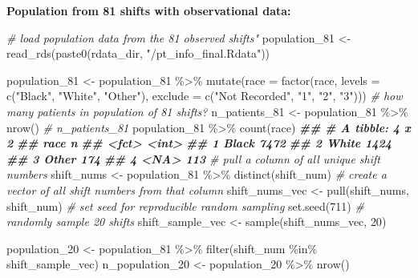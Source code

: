 \documentclass[
]{article}
\newenvironment{Shaded}{\begin{snugshade}}{\end{snugshade}}
\newcommand{\AttributeTok}[1]{\textcolor[rgb]{0.77,0.63,0.00}{#1}}
\newcommand{\CommentTok}[1]{\textcolor[rgb]{0.56,0.35,0.01}{\textit{#1}}}
\newcommand{\DecValTok}[1]{\textcolor[rgb]{0.00,0.00,0.81}{#1}}
\newcommand{\DocumentationTok}[1]{\textcolor[rgb]{0.56,0.35,0.01}{\textbf{\textit{#1}}}}
\newcommand{\FunctionTok}[1]{\textcolor[rgb]{0.00,0.00,0.00}{#1}}
\newcommand{\NormalTok}[1]{#1}
\newcommand{\OtherTok}[1]{\textcolor[rgb]{0.56,0.35,0.01}{#1}}
\newcommand{\SpecialCharTok}[1]{\textcolor[rgb]{0.00,0.00,0.00}{#1}}
\newcommand{\StringTok}[1]{\textcolor[rgb]{0.31,0.60,0.02}{#1}}
\begin{document}
\textbf{Population from 81 shifts with observational data:}

\begin{Shaded}
\begin{Highlighting}[]
\CommentTok{\# load population data from the 81 observed shifts"}
\NormalTok{population\_81 }\OtherTok{\textless{}{-}} \FunctionTok{read\_rds}\NormalTok{(}\FunctionTok{paste0}\NormalTok{(rdata\_dir, }\StringTok{"/pt\_info\_final.Rdata"}\NormalTok{))}

\NormalTok{population\_81 }\OtherTok{\textless{}{-}}\NormalTok{ population\_81 }\SpecialCharTok{\%\textgreater{}\%} 
  \FunctionTok{mutate}\NormalTok{(}\AttributeTok{race =} \FunctionTok{factor}\NormalTok{(race,}
              \AttributeTok{levels =} \FunctionTok{c}\NormalTok{(}\StringTok{"Black"}\NormalTok{,}
                         \StringTok{"White"}\NormalTok{,}
                         \StringTok{"Other"}\NormalTok{),}
              \AttributeTok{exclude =} \FunctionTok{c}\NormalTok{(}\StringTok{"Not Recorded"}\NormalTok{, }\StringTok{"1"}\NormalTok{, }\StringTok{"2"}\NormalTok{, }\StringTok{"3"}\NormalTok{)))}
\CommentTok{\# how many patients in population of 81 shifts?}
\NormalTok{n\_patients\_81 }\OtherTok{\textless{}{-}}\NormalTok{ population\_81 }\SpecialCharTok{\%\textgreater{}\%}
  \FunctionTok{nrow}\NormalTok{()}
\CommentTok{\# n\_patients\_81}
\NormalTok{population\_81 }\SpecialCharTok{\%\textgreater{}\%} 
  \FunctionTok{count}\NormalTok{(race)}
\DocumentationTok{\#\# \# A tibble: 4 x 2}
\DocumentationTok{\#\#   race      n}
\DocumentationTok{\#\#   \textless{}fct\textgreater{} \textless{}int\textgreater{}}
\DocumentationTok{\#\# 1 Black  7472}
\DocumentationTok{\#\# 2 White  1424}
\DocumentationTok{\#\# 3 Other   174}
\DocumentationTok{\#\# 4 \textless{}NA\textgreater{}    113}
\CommentTok{\# pull a column of all unique shift numbers}
\NormalTok{shift\_nums }\OtherTok{\textless{}{-}}\NormalTok{ population\_81 }\SpecialCharTok{\%\textgreater{}\%} 
  \FunctionTok{distinct}\NormalTok{(shift\_num)}
\CommentTok{\# create a vector of all shift numbers from that column}
\NormalTok{shift\_nums\_vec }\OtherTok{\textless{}{-}} \FunctionTok{pull}\NormalTok{(shift\_nums, shift\_num)}
\CommentTok{\# set seed for reproducible random sampling}
\FunctionTok{set.seed}\NormalTok{(}\DecValTok{711}\NormalTok{)}
\CommentTok{\# randomly sample 20 shifts}
\NormalTok{shift\_sample\_vec }\OtherTok{\textless{}{-}} \FunctionTok{sample}\NormalTok{(shift\_nums\_vec, }\DecValTok{20}\NormalTok{)}

\NormalTok{population\_20 }\OtherTok{\textless{}{-}}\NormalTok{ population\_81 }\SpecialCharTok{\%\textgreater{}\%} 
  \FunctionTok{filter}\NormalTok{(shift\_num }\SpecialCharTok{\%in\%}\NormalTok{ shift\_sample\_vec) }
\NormalTok{n\_population\_20 }\OtherTok{\textless{}{-}}\NormalTok{ population\_20 }\SpecialCharTok{\%\textgreater{}\%} 
  \FunctionTok{nrow}\NormalTok{()}
\end{Highlighting}
\end{Shaded}
\end{document}
